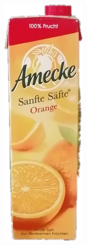 \begin{appendices}
\begin{figure}[htb]
\begin{minipage}[c]{0.2\textwidth}
\end{minipage}
\hfill
\begin{minipage}[c]{0.08\textwidth}
\includegraphics[width=\textwidth]{Sources/Bild2_HA.png}

\end{minipage}
\end{figure}
\end{appendices}
